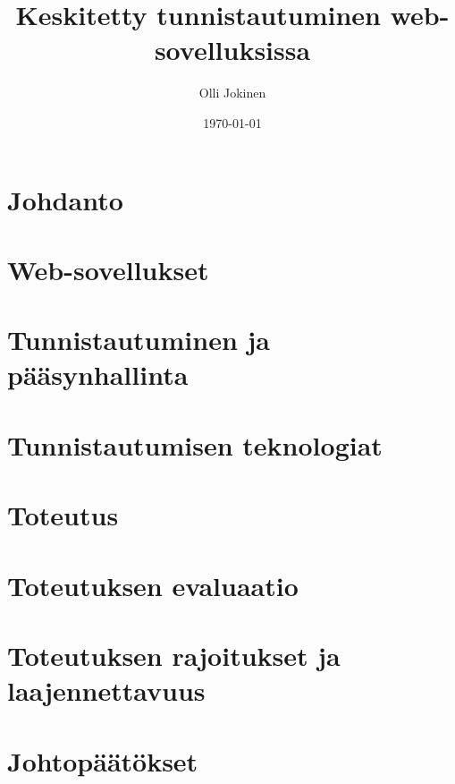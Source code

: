 \documentclass{tktltiki}
\begin{document}
\title{Keskitetty tunnistautuminen web-sovelluksissa}
\author{Olli Jokinen}
\date{\today}
\maketitle
\doublespacing
{}
\subject{Tietojenkäsittelytiede}
\additionalinformation{}
\begin{abstract}

\end{abstract}
\mytableofcontents
\section{Johdanto}

\section{Web-sovellukset}

\section{Tunnistautuminen ja pääsynhallinta}

\section{Tunnistautumisen teknologiat}

\section{Toteutus}

\section{Toteutuksen evaluaatio}

\section{Toteutuksen rajoitukset ja laajennettavuus}

\section{Johtopäätökset}




\lastpage
\end{document}
